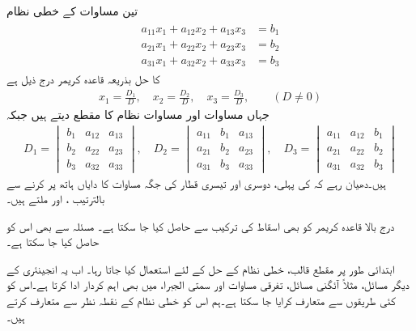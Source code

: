 تین مساوات کے خطی نظام
\begin{gather}
\begin{aligned}\label{مساوات_الجبرا_تین_درجی_خطی_کریمر}
a_{11}x_1+a_{12}x_2+a_{13}x_3&=b_1\\
a_{21}x_1+a_{22}x_2+a_{23}x_3&=b_2\\
a_{31}x_1+a_{32}x_2+a_{33}x_3&=b_3
\end{aligned}
\end{gather}
کا حل بذریعہ قاعدہ کریمر درج ذیل ہے
 \begin{align}
x_1=\frac{D_1}{D},\quad x_2=\frac{D_2}{D},\quad x_3=\frac{D_3}{D},\quad \quad (D\ne 0)
\end{align}
جہاں مساوات  اور مساوات  نظام کا مقطع   دیتے ہیں جبکہ 
\begin{align*}
D_1=
\begin{vmatrix}
b_1&a_{12}&a_{13}\\
b_2&a_{22}&a_{23}\\
b_3&a_{32}&a_{33}
\end{vmatrix},\quad
D_2=
\begin{vmatrix}
a_{11}&b_1&a_{13}\\
a_{21}&b_2&a_{23}\\
a_{31}&b_3&a_{33}
\end{vmatrix},\quad
D_3=
\begin{vmatrix}
a_{11}&a_{12}&b_1\\
a_{21}&a_{22}&b_2\\
a_{31}&a_{32}&b_3
\end{vmatrix}
\end{align*}
ہیں۔دھیان رہے کہ  کی پہلی، دوسری اور تیسری قطار کی جگہ مساوات  کا دایاں ہاتھ پر کرنے سے بالترتیب ،  اور  ملتے ہیں۔

درج بالا قاعدہ کریمر کو بھی اسقاط کی ترکیب سے حاصل کیا جا سکتا ہے۔  مسئلہ  سے بھی اس کو حاصل کیا جا سکتا ہے۔
 
ابتدائی طور پر مقطع قالب، خطی نظام کے حل کے لئے استعمال کیا جاتا رہا۔ اب یہ انجینئری کے دیگر مسائل، مثلاً آئگنی مسائل، تفرقی مساوات اور سمتی الجبرا، میں بھی اہم کردار ادا کرتا ہے۔اس کو کئی طریقوں سے متعارف کرایا جا سکتا ہے۔ہم اس کو خطی نظام کے نقطہ نظر سے  متعارف کرتے ہیں۔

